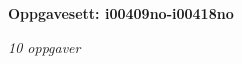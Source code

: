 \centerline{\bf Oppgavesett: i00409no-i00418no}
\vskip 10pt
\centerline{\it 10 oppgaver}\vskip 10pt
\vskip 10pt
